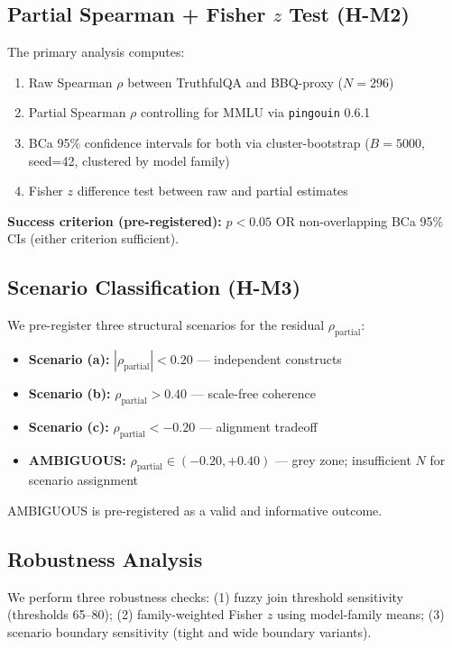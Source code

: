 \subsection{Partial Spearman + Fisher $z$ Test (H-M2)}

The primary analysis computes:
\begin{enumerate}
  \item Raw Spearman $\rho$ between TruthfulQA and BBQ-proxy ($N{=}296$)
  \item Partial Spearman $\rho$ controlling for MMLU via \texttt{pingouin} 0.6.1
  \item BCa 95\% confidence intervals for both via cluster-bootstrap ($B{=}5000$, seed=42, clustered by model family)
  \item Fisher $z$ difference test between raw and partial estimates
\end{enumerate}

\textbf{Success criterion (pre-registered):} $p < 0.05$ OR non-overlapping BCa 95\% CIs (either criterion sufficient).

\subsection{Scenario Classification (H-M3)}

We pre-register three structural scenarios for the residual $\rho_{\text{partial}}$:
\begin{itemize}
  \item \textbf{Scenario (a):} $|\rho_{\text{partial}}| < 0.20$ --- independent constructs
  \item \textbf{Scenario (b):} $\rho_{\text{partial}} > 0.40$ --- scale-free coherence
  \item \textbf{Scenario (c):} $\rho_{\text{partial}} < -0.20$ --- alignment tradeoff
  \item \textbf{AMBIGUOUS:} $\rho_{\text{partial}} \in (-0.20, +0.40)$ --- grey zone; insufficient $N$ for scenario assignment
\end{itemize}
AMBIGUOUS is pre-registered as a valid and informative outcome.

\subsection{Robustness Analysis}

We perform three robustness checks: (1) fuzzy join threshold sensitivity (thresholds 65--80); (2) family-weighted Fisher $z$ using model-family means; (3) scenario boundary sensitivity (tight and wide boundary variants).

